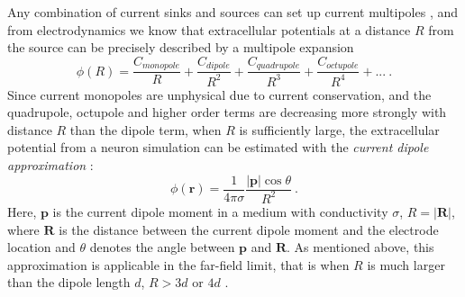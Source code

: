 \documentclass[preprint,11pt,authoryear]{elsarticle}
\begin{document}
Any combination of current sinks and sources can set up current multipoles \citep{Nunez2006}, and from electrodynamics we know that extracellular potentials at a distance $R$ from the source can be precisely described by a multipole expansion
\begin{equation}
\phi(R) = \frac{C_{monopole}}{R} + \frac{C_{dipole}}{R^2} + \frac{C_{quadrupole}}{R^3} + \frac{C_{octupole}}{R^4} + ...~.
\label{eq:dipole_expansion}
\end{equation}
Since current monopoles are unphysical due to current conservation, and the quadrupole, octupole and higher order terms are decreasing more strongly with distance $R$ than the dipole term, when $R$ is sufficiently large, the extracellular potential from a neuron simulation can be estimated with the \textit{current dipole approximation} \citep{Pettersen2008, Pettersen2014, Nunez2006}:
\begin{equation}
\phi(\mathbf{r}) = \frac{1}{4 \pi \sigma} \frac{|\mathbf{p}| \cos \theta}{R^2}~.
\label{eq:dipole}
\end{equation}
Here, $\mathbf{p}$ is the current dipole moment in a medium with conductivity $\sigma$, $R = |\mathbf{R}|$, where $\mathbf{R}$ is the distance between the current dipole moment and the electrode location and $\theta$ denotes the angle between $\mathbf{p}$ and $\mathbf{R}$. As mentioned above, this approximation is applicable in the far-field limit, that is when $R$ is much larger than the dipole length $d$, $R > 3d$ or $4d$ \citep{Nunez2006}.
\end{document}
